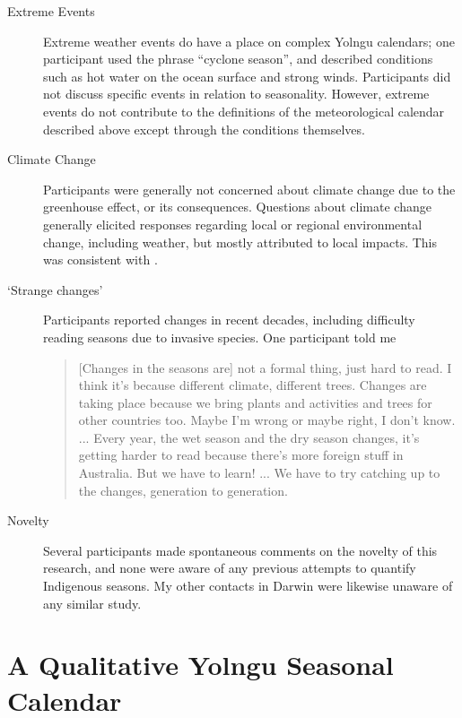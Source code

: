 \begin{description}
\item[Extreme Events]
    Extreme weather events do have a place on complex Yolngu calendars;
    one participant used the phrase ``cyclone season'', and described
    conditions such as hot water on the ocean surface and strong winds.
    Participants did not discuss specific events in relation to seasonality.
    However, extreme events do not contribute to the definitions of the
    meteorological calendar described above except through the conditions
    themselves.

\item[Climate Change]
    Participants were generally not concerned about climate change due to
    the greenhouse effect, or its consequences.  Questions about climate
    change generally elicited responses regarding local or regional
    environmental change, including weather, but mostly attributed to
    local impacts.  This was consistent with \citet{petheram2010}.

\item[`Strange changes']
    Participants reported changes in recent decades, including difficulty
    reading seasons due to invasive species.  One participant told me
    \begin{quote}
    [Changes in the seasons are] not a formal thing, just hard to read.
    I think it's because different climate, different trees.  Changes are
    taking place because we bring plants and activities and trees for
    other countries too.  Maybe I'm wrong or maybe right, I don't know.
    ...
    Every year, the wet season and the dry season changes, it's getting
    harder to read because there's more foreign stuff in Australia.
    But we have to learn! ... We have to try catching up to the changes,
    generation to generation.
    \end{quote}

\item[Novelty]
    Several participants made spontaneous comments on the novelty of this
    research, and none were aware of any previous attempts to quantify
    Indigenous seasons.  My other contacts in Darwin were likewise unaware
    of any similar study.
\end{description}



\section{A Qualitative Yolngu Seasonal Calendar}
\label{sec:calendar-description}

